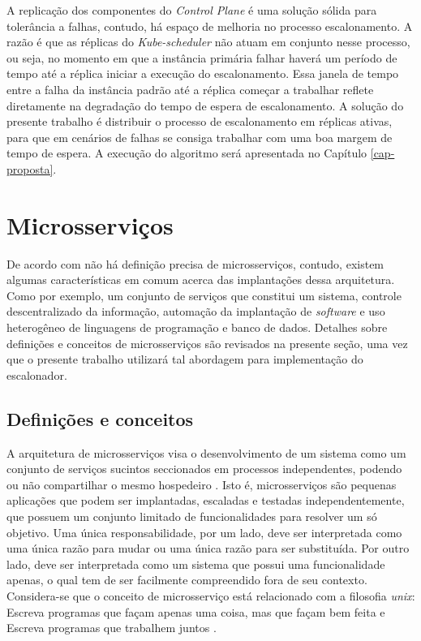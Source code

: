 A replicação dos componentes do \textit{Control Plane} é uma solução sólida para tolerância a falhas, contudo, há espaço de melhoria no processo escalonamento. A razão é que as réplicas do \textit{Kube-scheduler} não atuam em conjunto nesse processo, ou seja, no momento em que a instância primária falhar haverá um período de tempo até a réplica iniciar a execução do escalonamento. Essa janela de tempo entre a falha da instância padrão até a réplica começar a trabalhar reflete diretamente na degradação do tempo de espera de escalonamento. A solução do presente trabalho é distribuir o processo de escalonamento em réplicas ativas, para que em cenários de falhas se consiga trabalhar com uma boa margem de tempo de espera. A execução do algoritmo será apresentada no Capítulo \ref{cap-proposta}.

\section{Microsserviços}

De acordo com  não há definição precisa de microsserviços, contudo, existem algumas características em comum acerca das implantações dessa arquitetura. Como por exemplo, um conjunto de serviços que constitui um sistema, controle descentralizado da informação, automação da implantação de \textit{software} e uso heterogêneo de linguagens de programação e banco de dados.
Detalhes sobre definições e conceitos de microsserviços são revisados na presente seção, uma vez que o presente trabalho utilizará tal abordagem para implementação do escalonador.

\subsection{Definições e conceitos}
A arquitetura de microsserviços visa o desenvolvimento de um sistema como um conjunto de serviços sucintos seccionados em processos independentes, podendo ou não compartilhar o mesmo hospedeiro \cite{lewis2012microservices}. Isto é, microsserviços são pequenas aplicações que podem ser implantadas, escaladas e testadas independentemente, que possuem um conjunto limitado de funcionalidades para resolver um só objetivo. Uma única responsabilidade, por um lado, deve ser interpretada como uma única razão para mudar ou uma única razão para ser substituída. Por outro lado, deve ser interpretada como um sistema que possui uma funcionalidade apenas, o qual tem de ser facilmente  compreendido fora de seu contexto. Considera-se que o conceito de microsserviço está relacionado com a filosofia \textit{unix}: Escreva programas que façam apenas uma coisa, mas que façam bem feita e Escreva programas que trabalhem juntos \cite{thones2015microservices}.

